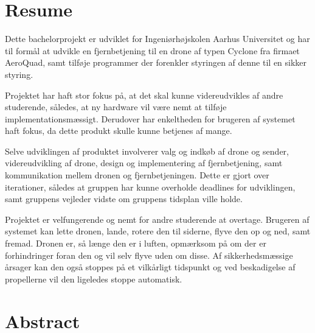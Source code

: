 \documentclass[Main]{subfiles}
\begin{document}
\chapter*{Resume}

Dette bachelorprojekt er udviklet for Ingeniørhøjskolen Aarhus Universitet og har til formål at udvikle en fjernbetjening til en drone af typen Cyclone fra firmaet AeroQuad, samt tilføje programmer der forenkler styringen af denne til en sikker styring.

Projektet har haft stor fokus på, at det skal kunne videreudvikles af andre studerende, således, at ny hardware vil være nemt at tilføje implementationsmæssigt.
Derudover har enkeltheden for brugeren af systemet haft fokus, da dette produkt skulle kunne betjenes af mange.

Selve udviklingen af produktet involverer valg og indkøb af drone og sender, videreudvikling af drone, design og implementering af fjernbetjening, samt kommunikation mellem dronen og fjernbetjeningen.
Dette er gjort over iterationer, således at gruppen har kunne overholde deadlines for udviklingen, samt gruppens vejleder vidste om gruppens tidsplan ville holde.

Projektet er velfungerende og nemt for andre studerende at overtage.
Brugeren af systemet kan lette dronen, lande, rotere den til siderne, flyve den op og ned, samt fremad.
Dronen er, så længe den er i luften, opmærksom på om der er forhindringer foran den og vil  selv flyve uden om disse.
Af sikkerhedsmæssige årsager kan den også stoppes på et vilkårligt tidspunkt og ved beskadigelse af propellerne vil den ligeledes stoppe automatisk.




















\chapter*{Abstract}
\end{document}
